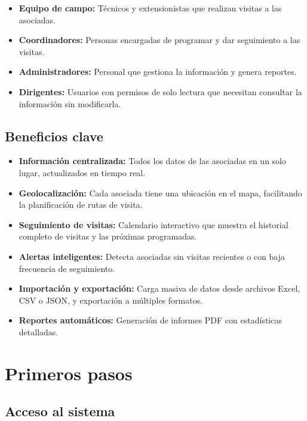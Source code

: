 \documentclass[12pt]{article}
\begin{document}
\begin{itemize}[nosep]
  \item \textbf{Equipo de campo:} Técnicos y extensionistas que realizan visitas a las asociadas.
  \item \textbf{Coordinadores:} Personas encargadas de programar y dar seguimiento a las visitas.
  \item \textbf{Administradores:} Personal que gestiona la información y genera reportes.
  \item \textbf{Dirigentes:} Usuarios con permisos de solo lectura que necesitan consultar la información sin modificarla.
\end{itemize}

\subsection{Beneficios clave}

\begin{itemize}[nosep]
  \item \textbf{Información centralizada:} Todos los datos de las asociadas en un solo lugar, actualizados en tiempo real.
  \item \textbf{Geolocalización:} Cada asociada tiene una ubicación en el mapa, facilitando la planificación de rutas de visita.
  \item \textbf{Seguimiento de visitas:} Calendario interactivo que muestra el historial completo de visitas y las próximas programadas.
  \item \textbf{Alertas inteligentes:} Detecta asociadas sin visitas recientes o con baja frecuencia de seguimiento.
  \item \textbf{Importación y exportación:} Carga masiva de datos desde archivos Excel, CSV o JSON, y exportación a múltiples formatos.
  \item \textbf{Reportes automáticos:} Generación de informes PDF con estadísticas detalladas.
\end{itemize}

\section{Primeros pasos}
\label{sec:primeros-pasos}

\subsection{Acceso al sistema}
\label{subsec:acceso}
\end{document}
